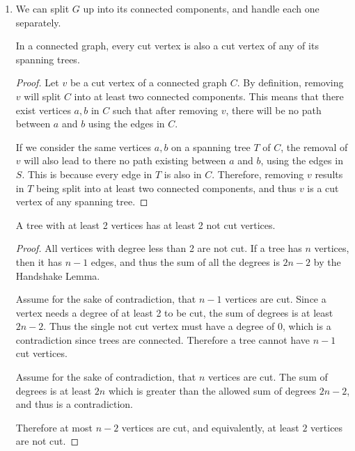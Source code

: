 \documentclass{article}
\begin{document}
\begin{solution}
\begin{enumerate}[label = (\alph*)]
    \item We can split $G$ up into its connected components, and handle each one separately.

    \begin{lemma}
        In a connected graph, every cut vertex is also a cut vertex of any of its spanning trees.
    \end{lemma}
    \begin{proof}
        Let $v$ be a cut vertex of a connected graph $C$. 
        By definition, removing $v$ will split $C$ into at least two connected components.
        This means that there exist vertices $a, b$ in $C$ such that after removing $v$, 
        there will be no path between $a$ and $b$ using the edges in $C$.

        If we consider the same vertices $a,b$ on a spanning tree $T$ of $C$, the removal of $v$ will also lead 
        to there no path existing between $a$ and $b$, using the edges in $S$.
        This is because every edge in $T$ is also in $C$. Therefore, removing $v$ results in $T$ being split into at least two connected components, 
        and thus $v$ is a cut vertex of any spanning tree.
    \end{proof}


    \begin{lemma}
        A tree with at least 2 vertices has at least 2 not cut vertices.
    \end{lemma}
    \begin{proof}
        All vertices with degree less than 2 are not cut. If a tree has $n$ vertices, then it has $n-1$ edges, and thus 
        the sum of all the degrees is $2n - 2$ by the Handshake Lemma. 
        
        Assume for the sake of contradiction, that $n-1$ vertices are cut.
        Since a vertex needs a degree of at least 2 to be cut, the sum of degrees is at least $2n - 2$. 
        Thus the single not cut vertex must have a degree of $0$, which is a contradiction since trees are connected.
        Therefore a tree cannot have $n-1$ cut vertices.

        Assume for the sake of contradiction, that $n$ vertices are cut. The sum of degrees is at least $2n$ which is greater than the allowed sum of degrees $2n-2$, and thus is a contradiction.

        Therefore at most $n-2$ vertices are cut, and equivalently, at least $2$ vertices are not cut.
    \end{proof}


\end{enumerate}
\end{solution}
\end{document}
